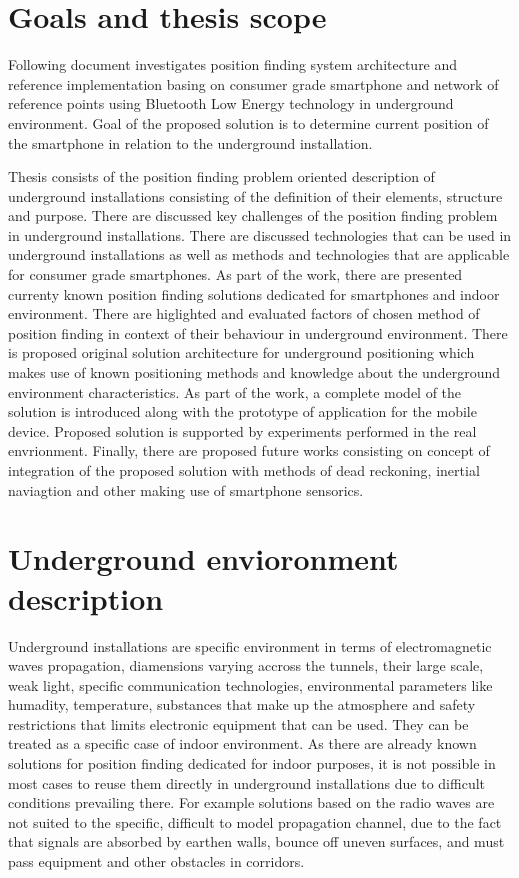 \documentclass[../main.tex]{subfiles}
\begin{document}
\chapter{Goals and thesis scope}

Following document investigates position finding system architecture and reference implementation basing on consumer grade smartphone and network of reference points using Bluetooth Low Energy technology in underground environment. Goal of the proposed solution is to determine current position of the smartphone in relation to the underground installation.

Thesis consists of the position finding problem oriented description of underground installations consisting of the definition of their elements, structure and purpose. There are discussed key challenges of the position finding problem in underground installations. There are discussed technologies that can be used in underground installations as well as methods and technologies that are applicable for consumer grade smartphones. As part of the work, there are presented currenty known position finding solutions dedicated for smartphones and indoor environment. There are higlighted and evaluated factors of chosen method of position finding in context of their behaviour in underground environment. There is proposed original solution architecture for underground positioning which makes use of known positioning methods and knowledge about the underground environment characteristics. As part of the work, a complete model of the solution is introduced along with the prototype of application for the mobile device. Proposed solution is supported by experiments performed in the real envrionment. Finally, there are proposed future works consisting on concept of integration of the proposed solution with methods of dead reckoning, inertial naviagtion and other making use of smartphone sensorics.

\chapter{Underground envioronment description}

Underground installations are specific environment in terms of electromagnetic waves propagation, diamensions varying accross the tunnels, their large scale, weak light, specific communication technologies, environmental parameters like humadity, temperature, substances that make up the atmosphere and safety restrictions that limits electronic equipment that can be used. They can be treated as a specific case of indoor environment. As there are already known solutions for position finding dedicated for indoor purposes, it is not possible in most cases to reuse them directly in underground installations due to difficult conditions prevailing there. For example solutions based on the radio waves are not suited to the specific, difficult to model propagation channel, due to the fact that signals are absorbed by earthen walls, bounce off uneven surfaces, and must pass equipment and other obstacles in corridors.
\end{document}

